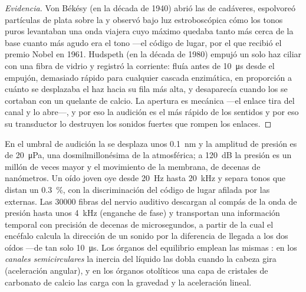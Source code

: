 \begin{proof}[Evidencia]
Von Békésy (en la década de 1940) abrió las  de cadáveres,
espolvoreó partículas de plata sobre la  y observó bajo
luz estroboscópica cómo los tonos puros levantaban una onda viajera
cuyo máximo quedaba tanto más cerca de la base cuanto más agudo era el
tono ---el código de lugar, por el que recibió el premio Nobel en 1961.
Hudspeth (en la década de 1980) empujó un solo haz ciliar con una fibra
de vidrio y registró la corriente: fluía antes de \qty{10}{\micro s}
desde el empujón, demasiado rápido para cualquier cascada enzimática,
en proporción a cuánto se desplazaba el haz hacia su fila más alta, y
desaparecía cuando los  se cortaban con un quelante de
calcio. La apertura es mecánica ---el enlace tira del canal y lo
abre---, y por eso la audición es el más rápido de los sentidos y por
eso su transductor lo destruyen los sonidos fuertes que rompen los
enlaces.
\end{proof}

\begin{example}\label{ex:b3:sensory-systems:ear-numbers}
En el umbral de audición la  se desplaza unos
\qty{0.1}{nm} y la amplitud de presión es de \qty{20}{\micro Pa}, una
dosmilmillonésima de la atmosférica; a \qty{120}{dB} la presión es un
millón de veces mayor y el movimiento de la membrana, de decenas de
nanómetros. Un oído joven oye desde \qty{20}{Hz} hasta \qty{20}{kHz} y
separa tonos que distan un \qty{0.3}{\%}, con la discriminación del
código de lugar afilada por las  externas. Las
\num{30000} fibras del nervio auditivo descargan al compás de la onda
de presión hasta unos \qty{4}{kHz} (enganche de fase) y transportan una
información temporal con precisión de decenas de microsegundos, a
partir de la cual el encéfalo calcula la dirección de un sonido por la
diferencia de llegada a los dos oídos ---de tan solo \qty{10}{\micro s}.
Los órganos del equilibrio emplean las mismas : en los
\emph{canales semicirculares} la inercia del líquido las dobla cuando
la cabeza gira (aceleración angular), y en los órganos otolíticos una
capa de cristales de carbonato de calcio las carga con la gravedad y la
aceleración lineal.
\end{example}

